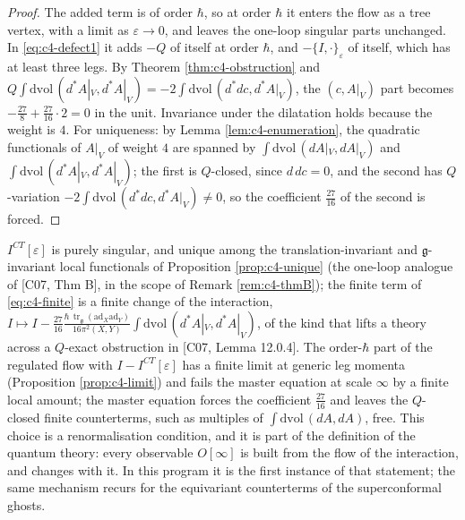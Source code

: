 \begin{proof}
The added term is of order $\hbar$, so at order $\hbar$ it enters the flow as a tree vertex, with a limit as $\varepsilon\to0$, and leaves the one-loop singular parts unchanged. In \eqref{eq:c4-defect1} it adds $-Q$ of itself at order $\hbar$, and $-\{I,\cdot\}_\varepsilon$ of itself, which has at least three legs. By Theorem \ref{thm:c4-obstruction} and $Q\int\mathrm{dvol}\,(d^*A|_V,d^*A|_V)=-2\int\mathrm{dvol}\,(d^*dc,d^*A|_V)$, the $(c,A|_V)$ part becomes $-\tfrac{27}{8}+\tfrac{27}{16}\cdot2=0$ in the unit. Invariance under the dilatation holds because the weight is $4$. For uniqueness: by Lemma \ref{lem:c4-enumeration}, the quadratic functionals of $A|_V$ of weight $4$ are spanned by $\int\mathrm{dvol}\,(dA|_V,dA|_V)$ and $\int\mathrm{dvol}\,(d^*A|_V,d^*A|_V)$; the first is $Q$-closed, since $d\,dc=0$, and the second has $Q$-variation $-2\int\mathrm{dvol}\,(d^*dc,d^*A|_V)\neq0$, so the coefficient $\tfrac{27}{16}$ of the second is forced.
\end{proof}

\begin{remark}
\label{rem:c4-condition}
$I^{CT}[\varepsilon]$ is purely singular, and unique among the translation-invariant and $\mathfrak g$-invariant local functionals of Proposition \ref{prop:c4-unique} (the one-loop analogue of [C07, Thm B], in the scope of Remark \ref{rem:c4-thmB}); the finite term of \eqref{eq:c4-finite} is a finite change of the interaction, $I\mapsto I-\tfrac{27}{16}\frac{\hbar\,\operatorname{tr}_{\mathfrak g}(\mathrm{ad}_X\mathrm{ad}_Y)}{16\pi^2(X,Y)}\int\mathrm{dvol}\,(d^*A|_V,d^*A|_V)$, of the kind that lifts a theory across a $Q$-exact obstruction in [C07, Lemma 12.0.4]. The order-$\hbar$ part of the regulated flow with $I-I^{CT}[\varepsilon]$ has a finite limit at generic leg momenta (Proposition \ref{prop:c4-limit}) and fails the master equation at scale $\infty$ by a finite local amount; the master equation forces the coefficient $\tfrac{27}{16}$ and leaves the $Q$-closed finite counterterms, such as multiples of $\int\mathrm{dvol}\,(dA,dA)$, free. This choice is a renormalisation condition, and it is part of the definition of the quantum theory: every observable $O[\infty]$ is built from the flow of the interaction, and changes with it. In this program it is the first instance of that statement; the same mechanism recurs for the equivariant counterterms of the superconformal ghosts.
\end{remark}

